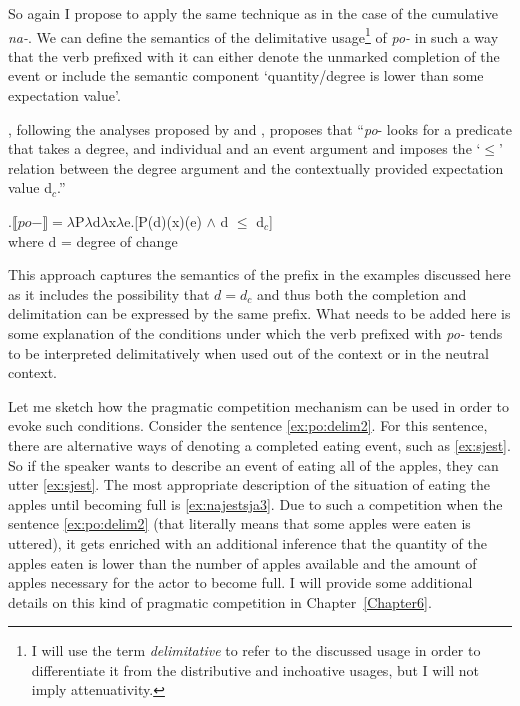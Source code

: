 So again I propose to apply the same technique as in the case of the cumulative \textit{na-}. We can define the semantics of the delimitative usage\footnote{I will use the term \textit{delimitative} to refer to the discussed usage in order to differentiate it from the distributive and inchoative usages, but I will not imply attenuativity.} of \textit{po-} in such a way that the verb prefixed with it can either denote the unmarked completion of the event or include the semantic component `quantity/degree is lower than some expectation value'. 

\citet[48]{Kagan:book}, following the analyses proposed by \citet{Filip:00} and \citet{Souchkova:04}, proposes that ``\textit{po}- looks for a predicate that takes a degree, and individual and an event argument and imposes the `$\leqslant$' relation between the degree argument and the contextually provided expectation value d$_c$.''

\ex.\label{Kagan:po}$\llbracket po- \rrbracket = \lambda$P$\lambda$d$\lambda$x$\lambda$e.[P(d)(x)(e) $\wedge$ d $\leqslant$ d$_c$]\\
where d = degree of change \citep{KennedyLevin:02}

This approach captures the semantics of the prefix in the examples discussed here as it includes the possibility that $d = d_c$ and thus both the completion and delimitation can be expressed by the same prefix. What needs to be added here is some explanation of the conditions under which the verb prefixed with \textit{po-} tends to be interpreted delimitatively when used out of the context or in the neutral context.

Let me sketch how the pragmatic competition mechanism can be used in order to evoke such conditions. Consider the sentence \ref{ex:po:delim2}. For this sentence, there are alternative ways of denoting a completed eating event, such as \ref{ex:sjest}. So if the speaker wants to describe an event of eating all of the apples, they can utter \ref{ex:sjest}. The most appropriate description of the situation of eating the apples until becoming full is \ref{ex:najestsja3}. Due to such a competition when the sentence \ref{ex:po:delim2} (that literally means that some apples were eaten is uttered), it gets enriched with an additional inference that the quantity of the apples eaten is lower than the number of apples available and the amount of apples necessary for the actor to become full. I will provide some additional details on this kind of pragmatic competition in Chapter~\ref{Chapter6}.


